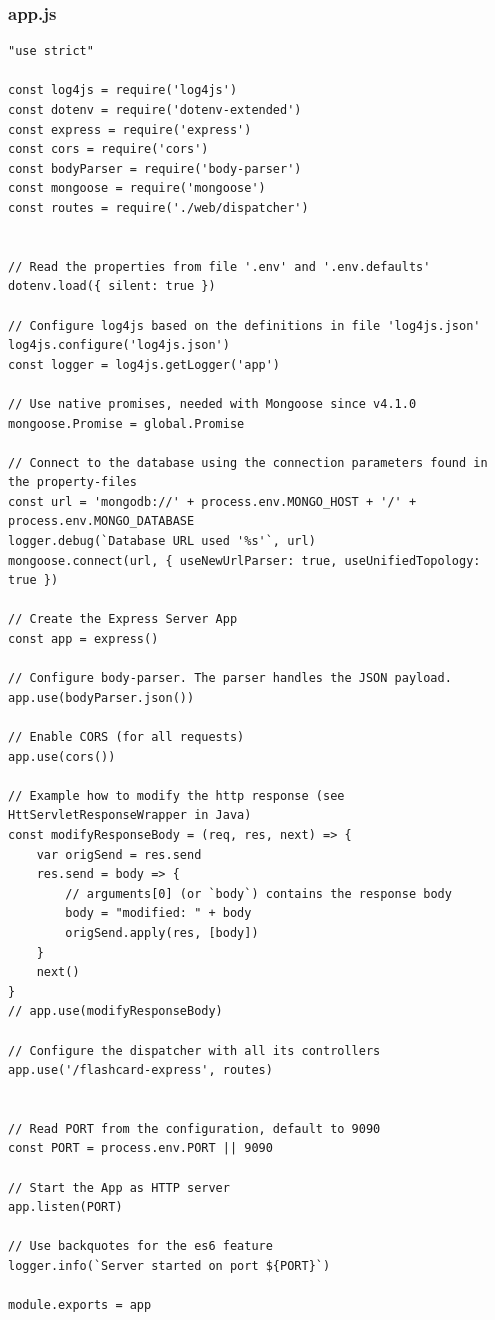 \subsubsection{app.js}
\begin{verbatim}
"use strict"

const log4js = require('log4js')
const dotenv = require('dotenv-extended')
const express = require('express')
const cors = require('cors')
const bodyParser = require('body-parser')
const mongoose = require('mongoose')
const routes = require('./web/dispatcher')


// Read the properties from file '.env' and '.env.defaults'
dotenv.load({ silent: true })

// Configure log4js based on the definitions in file 'log4js.json'
log4js.configure('log4js.json')
const logger = log4js.getLogger('app')

// Use native promises, needed with Mongoose since v4.1.0
mongoose.Promise = global.Promise

// Connect to the database using the connection parameters found in the property-files
const url = 'mongodb://' + process.env.MONGO_HOST + '/' + process.env.MONGO_DATABASE
logger.debug(`Database URL used '%s'`, url)
mongoose.connect(url, { useNewUrlParser: true, useUnifiedTopology: true })

// Create the Express Server App
const app = express()

// Configure body-parser. The parser handles the JSON payload.
app.use(bodyParser.json())

// Enable CORS (for all requests)
app.use(cors())

// Example how to modify the http response (see HttServletResponseWrapper in Java)
const modifyResponseBody = (req, res, next) => {
    var origSend = res.send
    res.send = body => {
        // arguments[0] (or `body`) contains the response body
        body = "modified: " + body
        origSend.apply(res, [body])
    }
    next()
}
// app.use(modifyResponseBody)

// Configure the dispatcher with all its controllers
app.use('/flashcard-express', routes)


// Read PORT from the configuration, default to 9090
const PORT = process.env.PORT || 9090

// Start the App as HTTP server
app.listen(PORT)

// Use backquotes for the es6 feature
logger.info(`Server started on port ${PORT}`)

module.exports = app
\end{verbatim}

